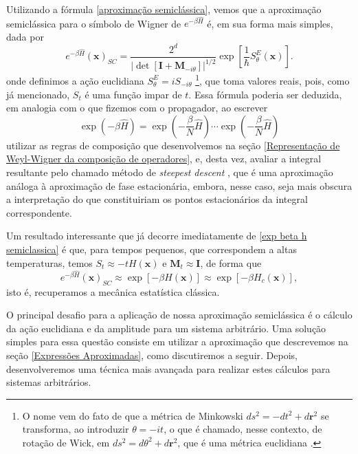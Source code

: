 \documentclass[
	12pt,
	oneside,			%
	a4paper,			%
	english,			%
	brazil				%
	]{abntex2}
\theoremstyle{definition}
\begin{document}
Utilizando a fórmula \eqref{aproximação semiclássica}, vemos que a aproximação semiclássica para o símbolo de Wigner de $e^{ -\beta \hat{H}}$ é, em sua forma mais simples, dada por
\begin{equation}
\label{exp beta h semiclassica}
    e^{-\beta \hat{H}}\left( \mathbf{x} \right)_{SC} = \frac{2^d}{\left|\det \left[ \mathbf{I} + \mathbf{M}_{-i\theta}\right] \right|^{1/2} } \exp \left[ \frac{1}{\hbar} S_\theta^{E} \left(\mathbf{x} \right) \right] .
\end{equation}
onde definimos a ação euclidiana $S^{E}_{\theta} = i S_{-i\theta}$ \footnote{O nome vem do fato de que a métrica de Minkowski $ds^2 = -dt^2 + d\mathbf{r}^2$ se transforma, ao introduzir $\theta = -i t$, o que é chamado, nesse contexto, de rotação de Wick, em $ds^2 = d\theta ^2 + d\mathbf{r}^2$, que é uma métrica euclidiana \cite{ingold2002path,greiner2013field}.}, que toma valores reais, pois, como já mencionado, $S_t$ é uma função impar de $t$. Essa fórmula poderia ser deduzida, em analogia com o que fizemos com o propagador, ao escrever
\begin{equation}
    \exp\left( -\beta \hat{H} \right) = \exp\left( -\frac{\beta}{N} \hat{H} \right) \cdots \exp\left( -\frac{\beta}{N} \hat{H} \right)
\end{equation}
utilizar as regras de composição que desenvolvemos na seção \ref{Representação de Weyl-Wigner da composição de operadores}, e, desta vez, avaliar a integral resultante pelo chamado método de \textit{steepest descent} \cite{balian2006microphysics}, que é uma aproximação análoga à aproximação de fase estacionária, embora, nesse caso, seja mais obscura a interpretação do que constituiriam os pontos estacionários da integral correspondente.

Um resultado interessante que já decorre imediatamente de \eqref{exp beta h semiclassica} é que, para tempos pequenos, que correspondem a altas temperaturas, temos $S_t \approx -t H\left(\mathbf{x}\right)$ e $\mathbf{M}_{t} \approx \mathbf{I}$, de forma que
\begin{equation}
\label{limite clássico}
    e^{-\beta \hat{H}}\left( \mathbf{x} \right)_{SC} \approx  \exp \left[ - \beta H\left(\mathbf{x}\right) \right] \approx  \exp \left[ - \beta H_c\left(\mathbf{x}\right) \right],
\end{equation}
isto é, recuperamos a mecânica estatística clássica.

O principal desafio para a aplicação de nossa aproximação semiclássica é o cálculo da ação euclidiana e da amplitude para um sistema arbitrário. Uma solução simples para essa questão consiste em utilizar a aproximação que descrevemos na seção \ref{Expressões Aproximadas}, como discutiremos a seguir. Depois, desenvolveremos uma técnica mais avançada para realizar estes cálculos para sistemas arbitrários.
\end{document}
